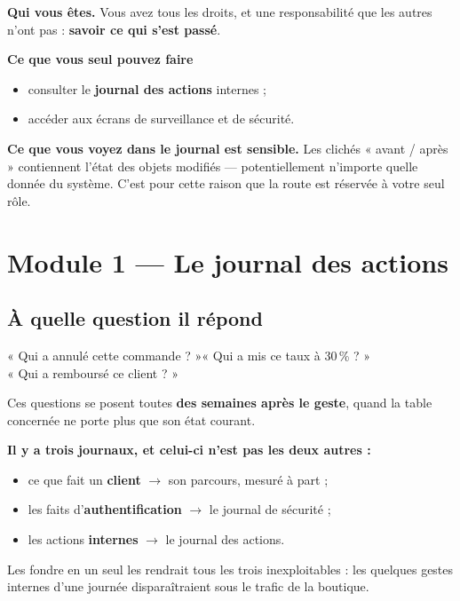 \documentclass[11pt,a4paper]{report}
\begin{document}
\begin{roleBox}
\textbf{Qui vous êtes.} Vous avez tous les droits, et une responsabilité que
les autres n'ont pas : \textbf{savoir ce qui s'est passé}.

\medskip
\textbf{Ce que vous seul pouvez faire}
\begin{itemize}[leftmargin=*,itemsep=2pt,topsep=3pt]
  \item consulter le \textbf{journal des actions} internes ;
  \item accéder aux écrans de surveillance et de sécurité.
\end{itemize}

\begin{attention}
\textbf{Ce que vous voyez dans le journal est sensible.} Les clichés « avant /
après » contiennent l'état des objets modifiés — potentiellement n'importe
quelle donnée du système. C'est pour cette raison que la route est réservée à
votre seul rôle.
\end{attention}
\end{roleBox}

\section{Module 1 — Le journal des actions}

\subsection{À quelle question il répond}

\begin{center}
\begin{tcolorbox}[width=0.9\linewidth,colback=garahAccent!7,
  colframe=garahAccent,arc=4pt,boxrule=1pt]
\centering
« Qui a annulé cette commande ? »\quad « Qui a mis ce taux à 30\,\% ? »\\
« Qui a remboursé ce client ? »
\end{tcolorbox}
\end{center}

Ces questions se posent toutes \textbf{des semaines après le geste}, quand la
table concernée ne porte plus que son état courant.

\begin{retenir}
\textbf{Il y a trois journaux, et celui-ci n'est pas les deux autres :}
\begin{itemize}[leftmargin=*,itemsep=1pt,topsep=3pt]
  \item ce que fait un \textbf{client} $\rightarrow$ son parcours, mesuré à part ;
  \item les faits d'\textbf{authentification} $\rightarrow$ le journal de sécurité ;
  \item les actions \textbf{internes} $\rightarrow$ le journal des actions.
\end{itemize}
Les fondre en un seul les rendrait tous les trois inexploitables : les quelques
gestes internes d'une journée disparaîtraient sous le trafic de la boutique.
\end{retenir}
\end{document}

